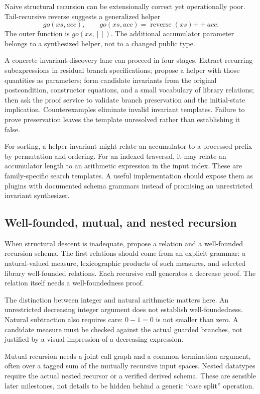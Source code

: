 Naive structural recursion can be extensionally correct yet operationally poor. Tail-recursive reverse suggests a generalized helper
\[
 go(xs,acc),\qquad
 go(xs,acc)=\operatorname{reverse}(xs)\mathbin{++}acc.
\]
The outer function is $go(xs,[])$. The additional accumulator parameter belongs to a synthesized helper, not to a changed public type.

A concrete invariant-discovery lane can proceed in four stages. Extract recurring subexpressions in residual branch specifications; propose a helper with those quantities as parameters; form candidate invariants from the original postcondition, constructor equations, and a small vocabulary of library relations; then ask the proof service to validate branch preservation and the initial-state implication. Counterexamples eliminate invalid invariant templates. Failure to prove preservation leaves the template unresolved rather than establishing it false.

For sorting, a helper invariant might relate an accumulator to a processed prefix by permutation and ordering. For an indexed traversal, it may relate an accumulator length to an arithmetic expression in the input index. These are family-specific search templates. A useful implementation should expose them as plugins with documented schema grammars instead of promising an unrestricted invariant synthesizer.

\subsection{Well-founded, mutual, and nested recursion}

When structural descent is inadequate, propose a relation and a well-founded recursion schema. The first relations should come from an explicit grammar: a natural-valued measure, lexicographic products of such measures, and selected library well-founded relations. Each recursive call generates a decrease proof. The relation itself needs a well-foundedness proof.

The distinction between integer and natural arithmetic matters here. An unrestricted decreasing integer argument does not establish well-foundedness. Natural subtraction also requires care: $0-1=0$ is not smaller than zero. A candidate measure must be checked against the actual guarded branches, not justified by a visual impression of a decreasing expression.

Mutual recursion needs a joint call graph and a common termination argument, often over a tagged sum of the mutually recursive input spaces. Nested datatypes require the actual nested recursor or a verified derived schema. These are sensible later milestones, not details to be hidden behind a generic ``case split'' operation.

